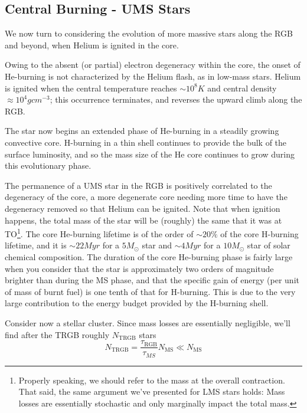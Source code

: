 \subsection{Central Burning - UMS Stars}

We now turn to considering the evolution of more massive stars along the RGB and beyond, when Helium is ignited in the core.
\par Owing to the absent (or partial) electron degeneracy within the core, the onset of He-burning is not characterized by the Helium flash, as in low-mass stars. Helium is ignited when the central temperature reaches $\sim 10^{8}\unit{K}$ and central density $\approx 10^{4}\unit{g}\unit{cm}^{-3}$; this occurrence terminates, and reverses the upward climb along the RGB.
\par The star now begins an extended phase of He-burning in a steadily growing convective core. H-burning in a thin shell continues to provide the bulk of the surface luminosity, and so the mass size of the He core continues to grow during this evolutionary phase.
\par The permanence of a UMS star in the RGB is positively correlated to the degeneracy of the core, a more degenerate core needing more time to have the degeneracy removed so that Helium can be ignited. Note that when ignition happens, the total mass of the star will be (roughly) the same that it was at TO\footnote{Properly speaking, we should refer to the mass at the overall contraction. That said, the same argument we've presented for LMS stars holds: Mass losses are essentially stochastic and only marginally impact the total mass.}. The core He-burning lifetime is of the order of $\sim 20\%$ of the core H-burning lifetime, and it is $\sim 22\unit{Myr}$ for a $5M_{\odot}$ star and $\sim 4\unit{Myr}$ for a $10M_{\odot}$ star of solar chemical composition. The duration of the core He-burning phase is fairly large when you consider that the star is approximately two orders of magnitude brighter than during the MS phase, and that the specific gain of energy (per unit of mass of burnt fuel) is one tenth of that for H-burning. This is due to the very large contribution to the energy budget provided by the H-burning shell.
\par Consider now a stellar cluster. Since mass losses are essentially negligible, we'll find after the TRGB roughly $N_{\text{TRGB}}$ stars
\begin{equation*}
    N_{\text{TRGB}} = \frac{\tau_{\text{RGB}}}{\tau_{MS}}N_{\text{MS}} \ll N_{\text{MS}}
\end{equation*}
